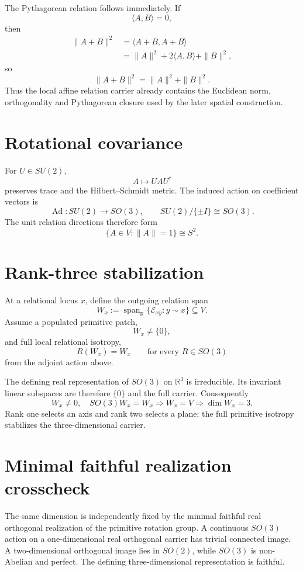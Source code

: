 The Pythagorean relation follows immediately. If
\[
\langle A,B\rangle=0,
\]
then
\[
\begin{aligned}
\|A+B\|^2
&=\langle A+B,A+B\rangle\\
&=\|A\|^2+2\langle A,B\rangle+\|B\|^2,
\end{aligned}
\]
so
\[
\boxed{\|A+B\|^2=\|A\|^2+\|B\|^2.}
\]
Thus the local affine relation carrier already contains the Euclidean norm,
orthogonality and Pythagorean closure used by the later spatial construction.

\section{Rotational covariance}

For \(U\in SU(2)\),
\[
A\mapsto UAU^\dagger
\]
preserves trace and the Hilbert--Schmidt metric.  The induced action on coefficient
vectors is
\[
\boxed{
\operatorname{Ad}:SU(2)\longrightarrow SO(3),
\qquad
SU(2)/\{\pm I\}\cong SO(3).
}
\]
The unit relation directions therefore form
\[
\boxed{
\{A\in V:\|A\|=1\}\cong S^2.
}
\]

\section{Rank-three stabilization}

At a relational locus \(x\), define the outgoing relation span
\[
W_x
:=
\operatorname{span}_{\mathbb R}
\{\mathcal E_{xy}:y\sim x\}
\subseteq V.
\]
Assume a populated primitive patch,
\[
W_x\neq\{0\},
\]
and full local relational isotropy,
\[
R(W_x)=W_x
\qquad
\text{for every }R\in SO(3)
\]
from the adjoint action above.

The defining real representation of \(SO(3)\) on \(\mathbb R^3\) is irreducible.
Its invariant linear subspaces are therefore \(\{0\}\) and the full carrier.
Consequently
\[
\boxed{
W_x\neq0,\quad SO(3)W_x=W_x
\Longrightarrow
W_x=V
\Longrightarrow
\dim W_x=3.
}
\]
Rank one selects an axis and rank two selects a plane; the full primitive isotropy
stabilizes the three-dimensional carrier.

\section{Minimal faithful realization crosscheck}

The same dimension is independently fixed by the minimal faithful real orthogonal
realization of the primitive rotation group. A continuous \(SO(3)\) action on a
one-dimensional real orthogonal carrier has trivial connected image.  A
two-dimensional orthogonal image lies in \(SO(2)\), while \(SO(3)\) is non-Abelian
and perfect.  The defining three-dimensional representation is faithful.

